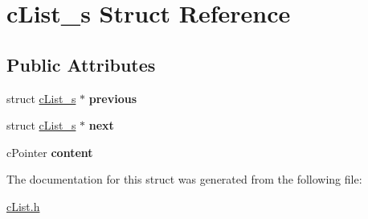 \hypertarget{structcList__s}{}\section{c\+List\+\_\+s Struct Reference}
\label{structcList__s}
\subsection*{Public Attributes}
\begin{DoxyCompactItemize}
\item 
\mbox{\label{structcList__s_abd46652450e4995cb6f037a165d89de9}} 
struct \mbox{\hyperlink{structcList__s}{c\+List\+\_\+s}} $\ast$ {\bfseries previous}
\item 
\mbox{\label{structcList__s_a547f271e39fb54a1442d43670418f6fc}} 
struct \mbox{\hyperlink{structcList__s}{c\+List\+\_\+s}} $\ast$ {\bfseries next}
\item 
\mbox{\label{structcList__s_a27d2aade2a116af377352a5bffc23414}} 
c\+Pointer {\bfseries content}
\end{DoxyCompactItemize}


The documentation for this struct was generated from the following file\+:\begin{DoxyCompactItemize}
\item 
\mbox{\hyperlink{cList_8h}{c\+List.\+h}}\end{DoxyCompactItemize}

